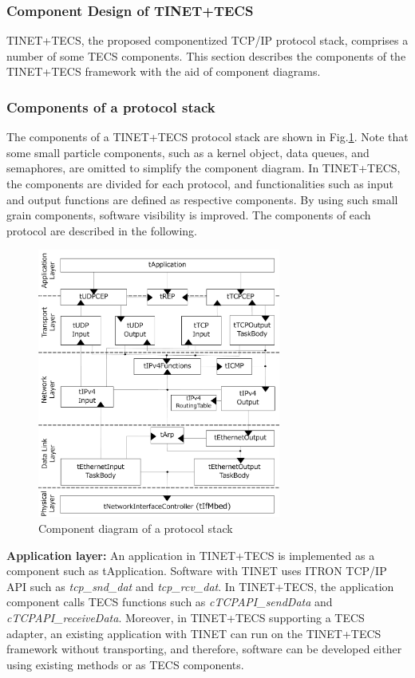\documentclass[JIP]{ipsj_v2/UTF8/ipsj}
\begin{document}
\subsubsection{Component Design of TINET+TECS}

TINET+TECS, the proposed componentized TCP/IP protocol stack, comprises a number of some TECS components.
This section describes the components of the TINET+TECS framework with the aid of component diagrams.

\subsubsection*{Components of a protocol stack}

The components of a TINET+TECS protocol stack are shown in Fig.\ref{fig:ComponentProtocolStack}.
Note that some small particle components, such as a kernel object, data queues, and semaphores, are omitted to simplify the component diagram.
In TINET+TECS, the components are divided for each protocol, and functionalities such as input and output functions are defined as respective components.
By using such small grain components, software visibility is improved.
The components of each protocol are described in the following.

\begin{figure}[t]
    \centering
    \includegraphics[width=8.0cm,clip]{figure/ComponentProtocolStack.pdf}
    \caption{Component diagram of a protocol stack}
    \label{fig:ComponentProtocolStack}
\end{figure}


{\bf Application layer:}
An application in TINET+TECS is implemented as a component such as tApplication.
Software with TINET uses ITRON TCP/IP API \cite{url:ITRON_TCP/IP_API_Spec} such as {\it tcp\_snd\_dat} and {\it tcp\_rcv\_dat}.
In TINET+TECS, the application component calls TECS functions such as {\it cTCPAPI\_sendData} and {\it cTCPAPI\_receiveData}.
Moreover, in TINET+TECS supporting a TECS adapter, an existing application with TINET can run on the TINET+TECS framework without transporting, and therefore, software can be developed either using existing methods or as TECS components.
\end{document}

